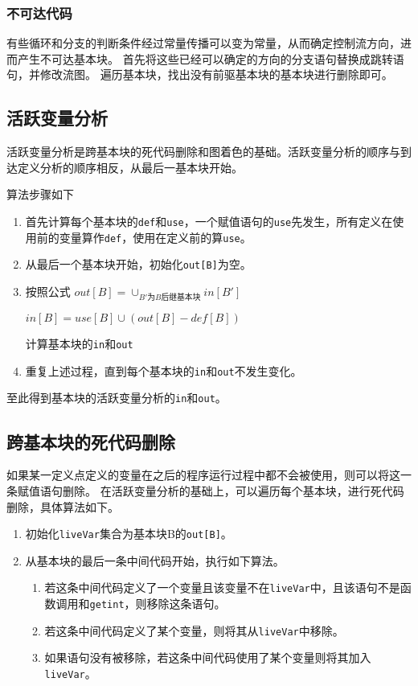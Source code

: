 \subsubsection{不可达代码}
有些循环和分支的判断条件经过常量传播可以变为常量，从而确定控制流方向，进而产生不可达基本块。
首先将这些已经可以确定的方向的分支语句替换成跳转语句，并修改流图。
遍历基本块，找出没有前驱基本块的基本块进行删除即可。

\subsection{活跃变量分析}

活跃变量分析是跨基本块的死代码删除和图着色的基础。活跃变量分析的顺序与到达定义分析的顺序相反，从最后一基本块开始。

算法步骤如下

\begin{enumerate}
    \item  首先计算每个基本块的\texttt{def}和\texttt{use}，一个赋值语句的\texttt{use}先发生，所有定义在使用前的变量算作\texttt{def}，使用在定义前的算\texttt{use}。
    \item  从最后一个基本块开始，初始化\texttt{out[B]}为空。
    \item  按照公式
            $out[B] = \cup_{B'为B后继基本块}in[B']$

            $in[B] = use[B] \cup (out[B] - def[B])$

            计算基本块的\texttt{in}和\texttt{out}
    \item  重复上述过程，直到每个基本块的\texttt{in}和\texttt{out}不发生变化。        
\end{enumerate}

至此得到基本块的活跃变量分析的\texttt{in}和\texttt{out}。

\subsection{跨基本块的死代码删除}

如果某一定义点定义的变量在之后的程序运行过程中都不会被使用，则可以将这一条赋值语句删除。
在活跃变量分析的基础上，可以遍历每个基本块，进行死代码删除，具体算法如下。
\begin{enumerate}
    \item  初始化\texttt{liveVar}集合为基本块B的\texttt{out[B]}。
    \item  从基本块的最后一条中间代码开始，执行如下算法。
    \begin{enumerate}
        \item 若这条中间代码定义了一个变量且该变量不在\texttt{liveVar}中，且该语句不是函数调用和\texttt{getint}，则移除这条语句。
        \item 若这条中间代码定义了某个变量，则将其从\texttt{liveVar}中移除。
        \item 如果语句没有被移除，若这条中间代码使用了某个变量则将其加入\texttt{liveVar}。
    \end{enumerate}
\end{enumerate}



